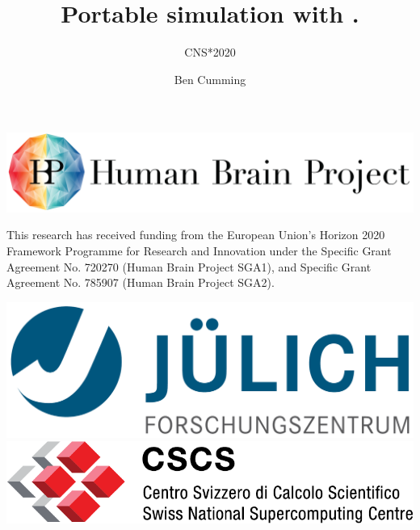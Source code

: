 \documentclass[aspectratio=43]{beamer}
\author{Ben Cumming}
\title{Portable simulation with \arbor.}
\subtitle{CNS*2020}
\newcommand{\arbor}{{\ttfamily Arbor}\xspace}
\begin{document}
\cscstitle

\begin{frame}[fragile]{}
    \begin{center}
        \includegraphics[height=0.15\textwidth]{logos/HBP_logo.jpg}
        \\ \vfill

        This research has received funding from the European Union’s Horizon 2020 Framework Programme for Research
        and Innovation under the Specific Grant Agreement No.  720270 (Human Brain Project SGA1), and Specific Grant
        Agreement No. 785907 (Human Brain Project SGA2).
        \\ \vfill

        \includegraphics[height=0.1\textwidth]{logos/julich_logo.pdf}
        \hspace{1cm}
        \includegraphics[height=0.09\textwidth]{logos/cscs_logo.pdf}
    \end{center}

\end{frame}


\end{document}
